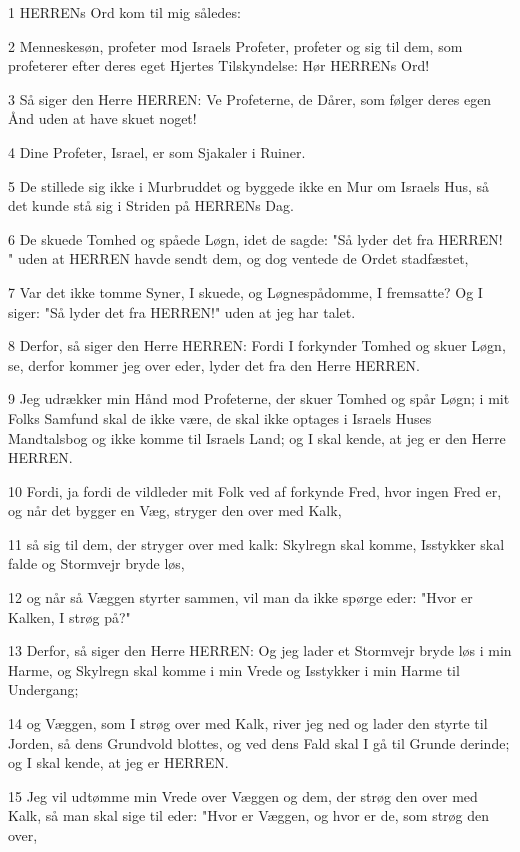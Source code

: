 \par 1 HERRENs Ord kom til mig således:
\par 2 Menneskesøn, profeter mod Israels Profeter, profeter og sig til dem, som profeterer efter deres eget Hjertes Tilskyndelse: Hør HERRENs Ord!
\par 3 Så siger den Herre HERREN: Ve Profeterne, de Dårer, som følger deres egen Ånd uden at have skuet noget!
\par 4 Dine Profeter, Israel, er som Sjakaler i Ruiner.
\par 5 De stillede sig ikke i Murbruddet og byggede ikke en Mur om Israels Hus, så det kunde stå sig i Striden på HERRENs Dag.
\par 6 De skuede Tomhed og spåede Løgn, idet de sagde: "Så lyder det fra HERREN! " uden at HERREN havde sendt dem, og dog ventede de Ordet stadfæstet,
\par 7 Var det ikke tomme Syner, I skuede, og Løgnespådomme, I fremsatte? Og I siger: "Så lyder det fra HERREN!" uden at jeg har talet.
\par 8 Derfor, så siger den Herre HERREN: Fordi I forkynder Tomhed og skuer Løgn, se, derfor kommer jeg over eder, lyder det fra den Herre HERREN.
\par 9 Jeg udrækker min Hånd mod Profeterne, der skuer Tomhed og spår Løgn; i mit Folks Samfund skal de ikke være, de skal ikke optages i Israels Huses Mandtalsbog og ikke komme til Israels Land; og I skal kende, at jeg er den Herre HERREN.
\par 10 Fordi, ja fordi de vildleder mit Folk ved af forkynde Fred, hvor ingen Fred er, og når det bygger en Væg, stryger den over med Kalk,
\par 11 så sig til dem, der stryger over med kalk: Skylregn skal komme, Isstykker skal falde og Stormvejr bryde løs,
\par 12 og når så Væggen styrter sammen, vil man da ikke spørge eder: "Hvor er Kalken, I strøg på?"
\par 13 Derfor, så siger den Herre HERREN: Og jeg lader et Stormvejr bryde løs i min Harme, og Skylregn skal komme i min Vrede og Isstykker i min Harme til Undergang;
\par 14 og Væggen, som I strøg over med Kalk, river jeg ned og lader den styrte til Jorden, så dens Grundvold blottes, og ved dens Fald skal I gå til Grunde derinde; og I skal kende, at jeg er HERREN.
\par 15 Jeg vil udtømme min Vrede over Væggen og dem, der strøg den over med Kalk, så man skal sige til eder: "Hvor er Væggen, og hvor er de, som strøg den over,

